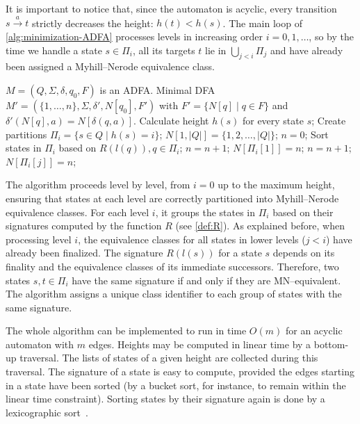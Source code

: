 It is important to notice that, since the automaton is acyclic, every transition $s \xrightarrow{a} t$ strictly decreases the height: $h(t) < h(s)$. The main loop of \cref{alg:minimization-ADFA} processes levels in increasing order $i=0,1,\dots$, so by the time we handle a state $s\in\Pi_i$, all its targets $t$ lie in $\bigcup_{j<i}\Pi_j$ and have already been assigned a Myhill--Nerode equivalence class.

\begin{algorithm}[H]
    \caption{$\textsc{RevuzMinimization}(M)$}
    \label{alg:minimization-ADFA}
    \begin{algorithmic}[1]
    \Require $M=(Q,\Sigma,\delta,q_0,F)$ is an ADFA.
    \Ensure Minimal DFA $M'=(\{1,\dots,n\},\Sigma,\delta',N[q_0],F')$ with $F'=\{N[q]\mid q\in F\}$ and $\delta'(N[q],a)=N[\delta(q,a)]$.
    \State Calculate height $h(s)$ for every state $s$;
    \State Create partitions $\Pi_i = \{s \in Q \mid h(s) = i\}$;
    \State $N[1, |Q|] = \{1,2,\dots,|Q|\}$; 
    \State $n = 0$;
     
        \State Sort states in $\Pi_i$ based on $R(l(q)), q\in \Pi_i$;
        \State $n = n + 1$;
        \State $N[\Pi_i[1]] = n$;
                \State $n = n + 1$;
            \EndIf
            \State $N[\Pi_i[j]] = n$;
        \EndFor
    \EndFor
    \end{algorithmic}
\end{algorithm}

The algorithm proceeds level by level, from $i=0$ up to the maximum height, ensuring that states at each level are correctly partitioned into Myhill--Nerode equivalence classes. For each level $i$, it groups the states in $\Pi_i$ based on their signatures computed by the function $R$ (see \cref{def:R}). As explained before, when processing level $i$, the equivalence classes for all states in lower levels ($j < i$) have already been finalized. The signature $R(l(s))$ for a state $s$ depends on its finality and the equivalence classes of its immediate successors. Therefore, two states $s, t \in \Pi_i$ have the same signature if and only if they are MN--equivalent. The algorithm assigns a unique class identifier to each group of states with the same signature.

The whole algorithm can be implemented to run in time $O(m)$ for an acyclic automaton with $m$ edges. Heights may be computed in linear time by
a bottom-up traversal. The lists of states of a given height are collected during this traversal. The signature of a state is easy to compute, provided the edges starting in a state have
been sorted (by a bucket sort, for instance, to remain within the linear time constraint).
Sorting states by their signature again is done by a lexicographic sort~\cite{berstel2010minimization}. 

